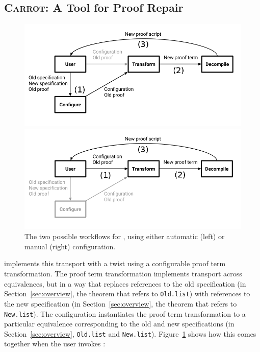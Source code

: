 \subsection{\textsc{Carrot}: A Tool for Proof Repair}
\label{sec:time}

\begin{figure}
\begin{minipage}{0.49\textwidth}
\includegraphics[width=\linewidth]{workflowa.png}
\end{minipage}
\hfill
\begin{minipage}{0.49\textwidth}
\includegraphics[width=\linewidth]{workflowb.png}
\end{minipage}
\vspace{-0.2cm}
\caption{The two possible workflows for \toolname, using either automatic (left) or manual (right) configuration.}
\label{fig:system}
\end{figure}

\toolname implements this transport with a twist using a configurable proof term transformation.
The proof term transformation implements transport across equivalences,
but in a way that replaces references to the old specification (in Section~\ref{sec:overview}, the theorem that refers to \lstinline{Old.list})
with references to the new specification (in Section~\ref{sec:overview}, the theorem that refers to \lstinline{New.list}).
The configuration instantiates the proof term transformation to a particular equivalence corresponding to the old and new 
specifications (in Section~\ref{sec:overview}, \lstinline{Old.list} and \lstinline{New.list}).
Figure~\ref{fig:system} shows how this comes together when the user invokes \toolname:

